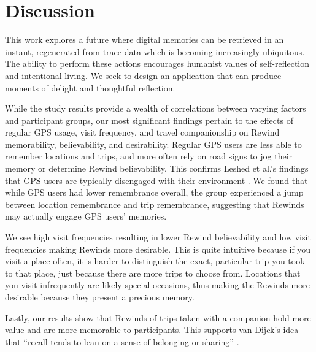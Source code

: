 \documentclass{sigchi}
\begin{document}

\section{Discussion}
This work explores a future where digital memories can be retrieved in an instant, regenerated from trace data which is becoming increasingly ubiquitous. The ability to perform these actions encourages humanist values of self-reflection and intentional living. We seek to design an application that can produce moments of delight and thoughtful reflection.

While the study results provide a wealth of correlations between varying factors and participant groups, our most significant findings pertain to the effects of regular GPS usage, visit frequency, and travel companionship on Rewind memorability, believability, and desirability. Regular GPS users are less able to remember locations and trips, and more often rely on road signs to jog their memory or determine Rewind believability. This confirms Leshed et al.'s findings that GPS users are typically disengaged with their environment \cite{leshed2008car}. We found that while GPS users had lower remembrance overall, the group experienced a jump between location remembrance and trip remembrance, suggesting that Rewinds may actually engage GPS users' memories. 

We see high visit frequencies resulting in lower Rewind believability and low visit frequencies making Rewinds more desirable. This is quite intuitive because if you visit a place often, it is harder to distinguish the exact, particular trip you took to that place, just because there are more trips to choose from. Locations that you visit infrequently are likely special occasions, thus making the Rewinds more desirable because they present a precious memory.

Lastly, our results show that Rewinds of trips taken with a companion hold more value and are more memorable to participants. This supports van Dijck's idea that ``recall tends to lean on a sense of belonging or sharing'' \cite{van2007mediated}.

		
\end{document}
